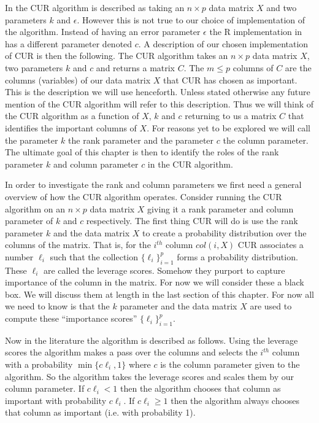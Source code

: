\documentclass{book}
\begin{document}
In \cite{pnas} the CUR algorithm is described as taking an $n\times p$ data matrix $X$ and two parameters $k$ and $\epsilon$. However this is not true to our choice of implementation of the algorithm. Instead of having an error parameter $\epsilon$ the R implementation in \cite{biomed} has a different parameter denoted $c$. A description of our chosen implementation of CUR is then the following. The CUR algorithm takes an $n \times p$ data matrix $X$, two parameters $k$ and $c$ and returns a matrix $C$. The $m\leq p$ columns of $C$ are the columns (variables) of our data matrix $X$ that CUR has chosen as important. This is the description we will use henceforth. Unless stated otherwise any future mention of the CUR algorithm will refer to this description. Thus we will think of the CUR algorithm as a function of $X$, $k$ and $c$ returning to us a matrix $C$ that identifies the important columns of $X$. For reasons yet to be explored we will call the parameter $k$ the rank parameter and the parameter $c$ the column parameter. The ultimate goal of this chapter is then to identify the roles of the rank parameter $k$ and column parameter $c$ in the CUR algorithm.

In order to investigate the rank and column parameters we first need a general overview of how the CUR algorithm operates. Consider running the CUR algorithm on an $n \times p$ data matrix $X$ giving it a rank parameter and column parameter of $k$ and $c$ respectively. The first thing CUR will do is use the rank parameter $k$ and the data matrix $X$ to create a probability distribution over the columns of the matrix. That is, for the $i^{th}$ column $col(i,X)$ CUR associates a number $\ell_i$ such that the collection $\{\ell_i\}_{i=1}^p$ forms a probability distribution. These $\ell_i$ are called the leverage scores. Somehow they purport to capture importance of the column in the matrix. For now we will consider these a black box. We will discuss them at length in the last section of this chapter. For now all we need to know is that the $k$ parameter and the data matrix $X$ are used to compute these ``importance scores'' $\{\ell_i\}_{i=1}^{p}$. 

Now in the literature the algorithm is described as follows. Using the leverage scores the algorithm makes a pass over the columns and selects the $i^{th}$ column with a probability $\min\{c\ell_i,1\}$ where $c$ is the column parameter given to the algorithm. So the algorithm takes the leverage scores and scales them by our column parameter. If $c\ell_i<1$ then the algorithm chooses that column as important with probability $c\ell_i$. If $c\ell_i \geq 1$ then the algorithm always chooses that column as important (i.e. with probability 1). 
\end{document}
